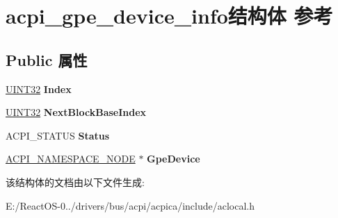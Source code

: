 \hypertarget{structacpi__gpe__device__info}{}\section{acpi\+\_\+gpe\+\_\+device\+\_\+info结构体 参考}
\label{structacpi__gpe__device__info}
\subsection*{Public 属性}
\begin{DoxyCompactItemize}
\item 
\mbox{\label{structacpi__gpe__device__info_a894f4ce10006a7ca5246b4223ce0839c}} 
\hyperlink{_processor_bind_8h_ae1e6edbbc26d6fbc71a90190d0266018}{U\+I\+N\+T32} {\bfseries Index}
\item 
\mbox{\label{structacpi__gpe__device__info_a038ba1c2b5daaaaafe523cd75524c6e1}} 
\hyperlink{_processor_bind_8h_ae1e6edbbc26d6fbc71a90190d0266018}{U\+I\+N\+T32} {\bfseries Next\+Block\+Base\+Index}
\item 
\mbox{\label{structacpi__gpe__device__info_a33181e34c96bdae069d7f0503369520e}} 
A\+C\+P\+I\+\_\+\+S\+T\+A\+T\+US {\bfseries Status}
\item 
\mbox{\label{structacpi__gpe__device__info_a304346b812afcf130c6854c937d6cd39}} 
\hyperlink{structacpi__namespace__node}{A\+C\+P\+I\+\_\+\+N\+A\+M\+E\+S\+P\+A\+C\+E\+\_\+\+N\+O\+DE} $\ast$ {\bfseries Gpe\+Device}
\end{DoxyCompactItemize}


该结构体的文档由以下文件生成\+:\begin{DoxyCompactItemize}
\item 
E\+:/\+React\+O\+S-\/0../drivers/bus/acpi/acpica/include/aclocal.\+h\end{DoxyCompactItemize}
